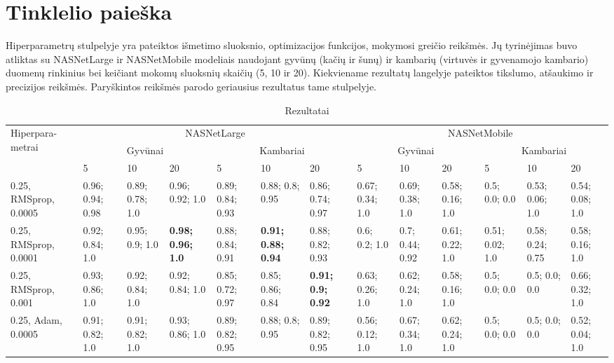 \documentclass{VUMIFPSbakalaurinis}
\begin{document}
\section{Tinklelio paieška}
Hiperparametrų stulpelyje yra pateiktos išmetimo sluoksnio, optimizacijos funkcijos, mokymosi greičio reikšmės. Jų tyrinėjimas buvo atliktas su NASNetLarge ir NASNetMobile modeliais naudojant gyvūnų (kačių ir šunų) ir kambarių (virtuvės ir gyvenamojo kambario) duomenų rinkinius bei keičiant mokomų sluoksnių skaičių (5, 10 ir 20). Kiekviename rezultatų langelyje pateiktos tikslumo, atšaukimo ir precizijos reikšmės. Paryškintos reikšmės parodo geriausius rezultatus tame stulpelyje. 
\setlength\LTleft{-0.8in}
\setlength\LTright{-1in}
\begin{longtable}{ | p{1.5cm} | p{1cm} | p{1cm} | p{1cm} | p{1cm} | p{1cm} | p{1cm} | p{1cm} | p{1cm} | p{1cm} | p{1cm} | p{1cm} | p{1cm} | }
    \caption{Rezultatai} \\
    \hline
    \multirow{3}{1.5cm}{Hiperpara- metrai} & \multicolumn{6}{c|}{NASNetLarge} & \multicolumn{6}{c|}{NASNetMobile} \\ \cline{2-13}
    & \multicolumn{3}{|c}{Gyvūnai} & \multicolumn{3}{|c}{Kambariai} & \multicolumn{3}{|c}{Gyvūnai} & \multicolumn{3}{|c|}{Kambariai} \\ \cline{2-13}
    & 5 & 10 & 20 & 5 & 10 & 20 & 5 & 10 & 20 & 5 & 10 & 20 \\  \hline
    \endhead
    0.25, RMSprop, 0.0005 & 0.96; 0.94; 0.98 & 0.89; 0.78; 1.0 & 0.96; 0.92; 1.0  &  0.89; 0.84; 0.93 & 0.88; 0.8; 0.95 & 0.86; 0.74; 0.97   &  0.67; 0.34; 1.0 & 0.69; 0.38; 1.0 & 0.58; 0.16; 1.0             &  0.5; 0.0; 0.0 & 0.53; 0.06; 1.0 & 0.54; 0.08; 1.0  \\ \hline
    0.25, RMSprop, 0.0001 & 0.92; 0.84; 1.0 & 0.95; 0.9; 1.0 & \textbf{0.98; 0.96; 1.0}    &  0.88; 0.84; 0.91 & \textbf{0.91; 0.88; 0.94} & 0.88; 0.82; 0.93  &  0.6; 0.2; 1.0 & 0.7; 0.44; 0.92 & 0.61; 0.22; 1.0  &  0.51; 0.02; 1.0 & 0.58; 0.24; 0.75 & 0.58; 0.16; 1.0  \\ \hline
    0.25, RMSprop, 0.001  & 0.93; 0.86; 1.0 & 0.92; 0.84; 1.0 & 0.92; 0.84; 1.0   & 0.85; 0.72; 0.97 & 0.85; 0.86; 0.84 & \textbf{0.91; 0.9; 0.92}    &  0.63; 0.26; 1.0 & 0.62; 0.24; 1.0 & 0.58; 0.16; 1.0    &  0.5; 0.0; 0.0 & 0.5; 0.0; 0.0 & 0.66; 0.32; 1.0  \\ \hline
    0.25, Adam, 0.0005    & 0.91; 0.82; 1.0 & 0.91; 0.82; 1.0 & 0.93; 0.86; 1.0   &  0.89; 0.82; 0.95 & 0.88; 0.8; 0.95 & 0.89; 0.82; 0.95   &  0.56; 0.12; 1.0 & 0.67; 0.34; 1.0 & 0.62; 0.24; 1.0             &  0.5; 0.0; 0.0 & 0.5; 0.0; 0.0 & 0.52; 0.04; 1.0  \\ \hline

\end{longtable}
\end{document}
